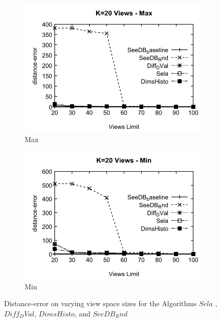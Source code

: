   
\begin{figure}[h]
  \centering

  \begin{subfigure}[b]{0.42\textwidth}
    \includegraphics[width=\textwidth]{MaxD2.pdf}
    \caption{Max}
        \label{fig:MaxD2}%
  \end{subfigure}
  \begin{subfigure}[b]{0.42\textwidth}
    \includegraphics[width=\textwidth]{MinD2.pdf}
     \caption{Min}
        \label{fig:MinD2}
  \end{subfigure}
  
  \caption{Distance-error on varying view space sizes for the Algorithms $Sela$ ,$Diff_DVal$, $DimsHisto$, and $SeeDB_Rnd$}
\end{figure}

